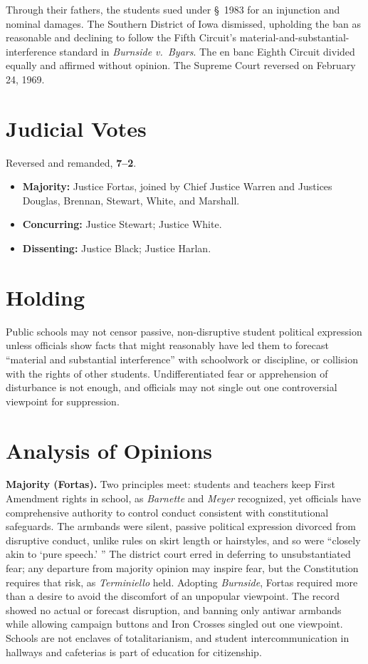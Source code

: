 \documentclass[12pt]{article}
\begin{document}
Through their fathers, the students sued under \S~1983 for an injunction and nominal damages. The Southern District of Iowa dismissed, upholding the ban as reasonable and declining to follow the Fifth Circuit's material-and-substantial-interference standard in \textit{Burnside v.\ Byars}. The en banc Eighth Circuit divided equally and affirmed without opinion. The Supreme Court reversed on February 24, 1969.

\section{Judicial Votes}

Reversed and remanded, \textbf{7--2}.
\begin{itemize}
\item \textbf{Majority:} Justice Fortas, joined by Chief Justice Warren and Justices Douglas, Brennan, Stewart, White, and Marshall.
\item \textbf{Concurring:} Justice Stewart; Justice White.
\item \textbf{Dissenting:} Justice Black; Justice Harlan.
\end{itemize}

\section{Holding}

Public schools may not censor passive, non-disruptive student political expression unless officials show facts that might reasonably have led them to forecast ``material and substantial interference'' with schoolwork or discipline, or collision with the rights of other students. Undifferentiated fear or apprehension of disturbance is not enough, and officials may not single out one controversial viewpoint for suppression.

\section{Analysis of Opinions}

\textbf{Majority (Fortas).} Two principles meet: students and teachers keep First Amendment rights in school, as \textit{Barnette} and \textit{Meyer} recognized, yet officials have comprehensive authority to control conduct consistent with constitutional safeguards. The armbands were silent, passive political expression divorced from disruptive conduct, unlike rules on skirt length or hairstyles, and so were ``closely akin to `pure speech.' '' The district court erred in deferring to unsubstantiated fear; any departure from majority opinion may inspire fear, but the Constitution requires that risk, as \textit{Terminiello} held. Adopting \textit{Burnside}, Fortas required more than a desire to avoid the discomfort of an unpopular viewpoint. The record showed no actual or forecast disruption, and banning only antiwar armbands while allowing campaign buttons and Iron Crosses singled out one viewpoint. Schools are not enclaves of totalitarianism, and student intercommunication in hallways and cafeterias is part of education for citizenship.
\end{document}
